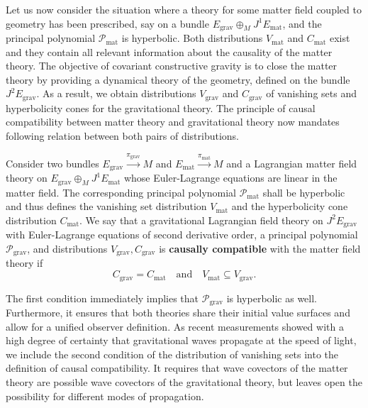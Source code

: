 Let us now consider the situation where a theory for some matter field coupled to geometry has been prescribed, say on a bundle $E_\text{grav} \oplus_M J^1 E_\text{mat}$, and the principal polynomial $\mathcal P_\text{mat}$ is hyperbolic. Both distributions $V_\text{mat}$ and $C_\text{mat}$ exist and they contain all relevant information about the causality of the matter theory. The objective of covariant constructive gravity is to close the matter theory by providing a dynamical theory of the geometry, defined on the bundle $J^2E_\text{grav}$. As a result, we obtain distributions $V_\text{grav}$ and $C_\text{grav}$ of vanishing sets and hyperbolicity cones for the gravitational theory. The principle of causal compatibility between matter theory and gravitational theory now mandates following relation between both pairs of distributions.
\begin{definition}\label{causal_compatibility_def}
  Consider two bundles $E_\text{grav}\overset{\pi_\text{grav}}{\longrightarrow}M$ and $E_\text{mat}\overset{\pi_\text{mat}}{\longrightarrow}M$ and a Lagrangian matter field theory on $E_\text{grav} \oplus_M J^1E_\text{mat}$ whose Euler-Lagrange equations are linear in the matter field. The corresponding principal polynomial $\mathcal P_\text{mat}$ shall be hyperbolic and thus defines the vanishing set distribution $V_\text{mat}$ and the hyperbolicity cone distribution $C_\text{mat}$. We say that a gravitational Lagrangian field theory on $J^2E_\text{grav}$ with Euler-Lagrange equations of second derivative order, a principal polynomial $\mathcal P_\text{grav}$, and distributions $V_\text{grav},C_\text{grav}$ is \textbf{causally compatible} with the matter field theory if
  \begin{equation}\label{axiom2_eq}
    C_\text{grav} = C_\text{mat}\quad \text{and}\quad V_\text{mat} \subseteq V_\text{grav}.
  \end{equation}
\end{definition}
The first condition immediately implies that $\mathcal P_\text{grav}$ is hyperbolic as well. Furthermore, it ensures that both theories share their initial value surfaces and allow for a unified observer definition\cite{sergio,sergio_paper}. As recent measurements showed with a high degree of certainty that gravitational waves propagate at the speed of light, we include the second condition of the distribution of vanishing sets into the definition of causal compatibility. It requires that wave covectors of the matter theory are possible wave covectors of the gravitational theory, but leaves open the possibility for different modes of propagation.

